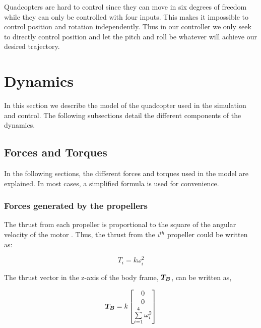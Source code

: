 \documentclass[12pt,fleqn]{article}
\newcommand{\mbm}[1]{\mbox{\boldmath $#1$}}
\begin{document}
Quadcopters are hard to control since they can move in six degrees of freedom while they can only be controlled with four inputs. This makes it impossible to control position and rotation independently. Thus in our controller we only seek to directly control position and let the pitch and roll be whatever will achieve our desired trajectory.




\section{Dynamics}
In this section we describe the model of the quadcopter used in the
simulation and control. The following subsections detail the different
components of the dynamics.

\subsection{Forces and Torques}

In the following sections, the different forces and torques used in
the model are explained. In most cases, a simplified formula is used
for convenience. 

\subsubsection{Forces generated by the propellers}

The thrust from each propeller is proportional to the square of the
angular velocity of the motor \cite{Andrew}. Thus, the thrust from the
$i^{th}$ propeller could be written as:

$$ T_i = k\omega_i^2 $$

The thrust vector in the z-axis of the body frame, $\mbm{T_{B}}$, can
be written as, 

\begin{equation} \label{thrust}
$$ \mbm{T_{B}} = k \begin{bmatrix}0 \\ 0\\ \sum \limits_{i=1}^{4}
  \omega_i^2 \end{bmatrix} $$
\end{equation}
\end{document}
